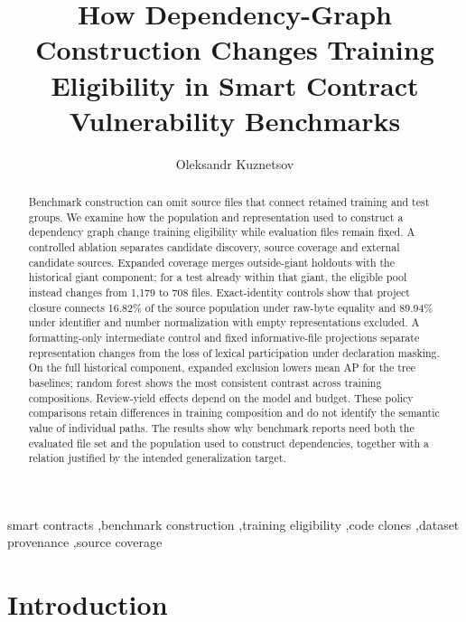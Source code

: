 \documentclass[preprint,12pt]{elsarticle}
\begin{document}
\begin{frontmatter}
\title{How Dependency-Graph Construction Changes Training Eligibility in Smart Contract Vulnerability Benchmarks}
\author[ecampus,karazin]{Oleksandr Kuznetsov}
\begin{abstract}
Benchmark construction can omit source files that connect retained training and test groups. We examine how the population and representation used to construct a dependency graph change training eligibility while evaluation files remain fixed. A controlled ablation separates candidate discovery, source coverage and external candidate sources. Expanded coverage merges outside-giant holdouts with the historical giant component; for a test already within that giant, the eligible pool instead changes from 1,179 to 708 files. Exact-identity controls show that project closure connects 16.82\% of the source population under raw-byte equality and 89.94\% under identifier and number normalization with empty representations excluded. A formatting-only intermediate control and fixed informative-file projections separate representation changes from the loss of lexical participation under declaration masking. On the full historical component, expanded exclusion lowers mean AP for the tree baselines; random forest shows the most consistent contrast across training compositions. Review-yield effects depend on the model and budget. These policy comparisons retain differences in training composition and do not identify the semantic value of individual paths. The results show why benchmark reports need both the evaluated file set and the population used to construct dependencies, together with a relation justified by the intended generalization target.
\end{abstract}
\begin{keyword}
smart contracts \sep benchmark construction \sep training eligibility \sep code clones \sep dataset provenance \sep source coverage
\end{keyword}
\end{frontmatter}
\section{Introduction}\label{introduction}
\end{document}
